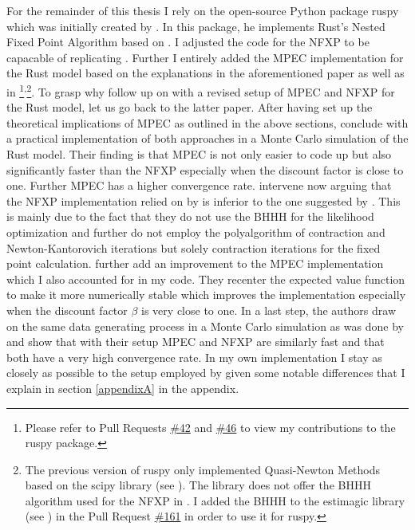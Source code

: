 For the remainder of this thesis I rely on the open-source Python package ruspy which was initially created by \cite{Blesch.2019}. In this package, he implements Rust's Nested Fixed Point Algorithm based on \cite{Rust.2000}. I adjusted the code for the NFXP to be capacable of replicating \cite{Iskhakov.2016}. Further I entirely added the MPEC implementation for the Rust model based on the explanations in the aforementioned paper as well as in \cite{Su.Judd.2012} \footnote{Please refer to Pull Requests \href{https://github.com/OpenSourceEconomics/ruspy/pull/42}{\#42} and \href{https://github.com/OpenSourceEconomics/ruspy/pull/46}{\#46} to view my contributions to the ruspy package.}\textsuperscript{,}\footnote{The previous version of ruspy only implemented Quasi-Newton Methods based on the scipy library (see \cite{scipy.2020}). The library does not offer the BHHH algorithm used for the NFXP in \cite{Iskhakov.2016}. I added the BHHH to the estimagic library (see \cite{Gabler.2019}) in the Pull Request \href{https://github.com/OpenSourceEconomics/estimagic/pull/161}{\#161} in order to use it for ruspy.}. To grasp why \citeauthor{Iskhakov.2016} follow up on \citeauthor{Su.Judd.2012} with a revised setup of MPEC and NFXP for the Rust model, let us go back to the latter paper. After having set up the theoretical implications of MPEC as outlined in the above sections, \citeauthor{Su.Judd.2012} conclude with a practical implementation of both approaches in a Monte Carlo simulation of the Rust model. Their finding is that MPEC is not only easier to code up but also significantly faster than the NFXP especially when the discount factor is close to one. Further MPEC has a higher convergence rate. \citeauthor{Iskhakov.2016} intervene now arguing that the NFXP implementation relied on by \citeauthor{Su.Judd.2012} is inferior to the one suggested by \cite{Rust.2000}. This is mainly due to the fact that they do not use the BHHH for the likelihood optimization and further do not employ the polyalgorithm of contraction and Newton-Kantorovich iterations but solely contraction iterations for the fixed point calculation. \citeauthor{Iskhakov.2016} further add an improvement to the MPEC implementation which I also accounted for in my code. They recenter the expected value function to make it more numerically stable which improves the implementation especially when the discount factor $\beta$ is very close to one. In a last step, the authors draw on the same data generating process in a Monte Carlo simulation as was done by \citeauthor{Su.Judd.2012} and show that with their setup MPEC and NFXP are similarly fast and that both have a very high convergence rate. In my own implementation I stay as closely as possible to the setup employed by \citeauthor{Iskhakov.2016} given some notable differences that I explain in section \ref{appendixA} in the appendix.

